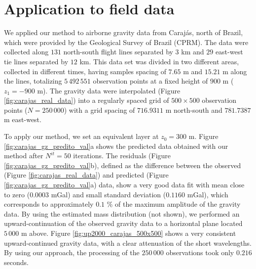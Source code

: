 \section{Application to field data}

We applied our method to airborne gravity data from Caraj{\'a}s, north of Brazil, which were provided by 
the Geological Survey of Brazil (CPRM). The data were collected along $131$ north-south flight lines separated 
by $3$ km and $29$ east-west tie lines separated by $12$ km.
This data set was divided in two different areas, collected in different times, having samples spacing of 
$7.65$ m and $15.21$ m along the lines, totalizing  $5\,492\,551$ observation points at a fixed height 
of $900$ m ($z_{1} = -900$ m). 
The gravity data were interpolated (Figure \ref{fig:carajas_real_data}) into a regularly spaced grid of 
$500 \times 500$ observation points ($N = 250\,000$) with a grid spacing of $716.9311$ m north-south and 
$781.7387$ m east-west.

To apply our method, we set an equivalent layer at $z_{0} = 300$ m. 
Figure \ref{fig:carajas_gz_predito_val}a shows the predicted data obtained with our method after 
$N^{it} = 50$ iterations.
The residuals (Figure \ref{fig:carajas_gz_predito_val}b), defined as the difference between the observed 
(Figure \ref{fig:carajas_real_data}) and predicted (Figure \ref{fig:carajas_gz_predito_val}a) data, show a 
very good data fit with mean close to zero ($0.0003$ mGal) and small standard deviation ($0.1160$ mGal), 
which corresponds to approximately $0.1$ \% of the maximum amplitude of the gravity data.
By using the estimated mass distribution (not shown), we performed an upward-continuation of the 
observed gravity data to a horizontal plane located $5\,000$ m above. Figure \ref{fig:up2000_carajas_500x500} 
shows a very consistent upward-continued gravity data, with a clear attenuation of the short 
wavelengths. By using our approach, the processing of the $250\,000$ observations took only 
$0.216$ seconds.